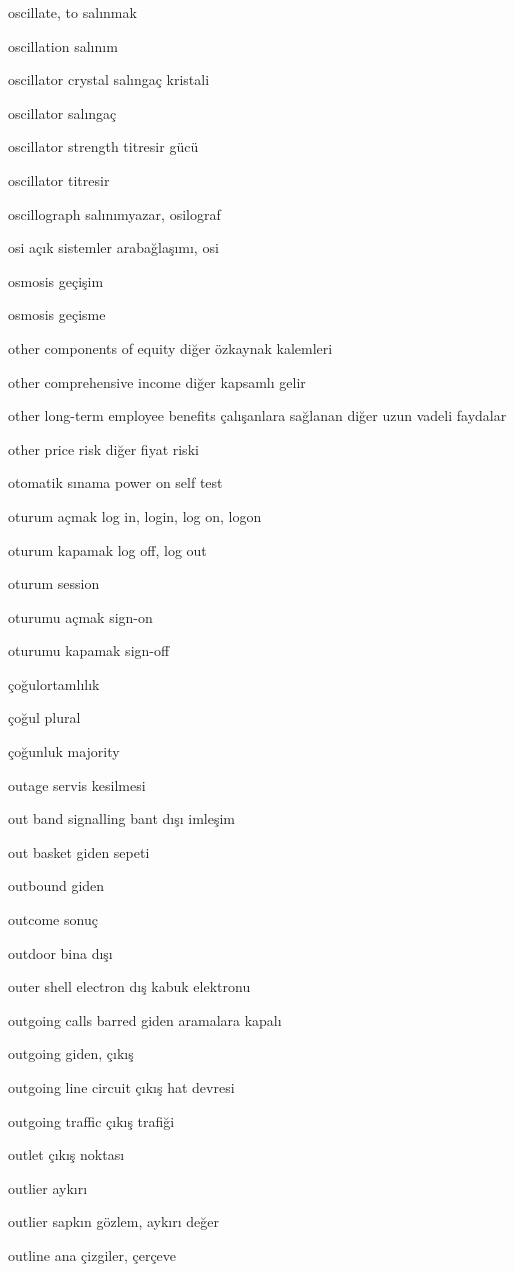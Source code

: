 \documentclass[12pt,fleqn]{article}\usepackage{../../common}
\begin{document}
oscillate, to salınmak

oscillation salınım

oscillator crystal salıngaç kristali

oscillator salıngaç

oscillator strength titresir gücü

oscillator titresir

oscillograph salınımyazar, osilograf

osi açık sistemler arabağlaşımı, osi

osmosis geçişim

osmosis geçisme

other components of equity diğer özkaynak kalemleri

other comprehensive income diğer kapsamlı gelir

other long-term employee benefits çalışanlara sağlanan diğer uzun vadeli faydalar

other price risk diğer fiyat riski

otomatik sınama power on self test

oturum açmak log in, login, log on, logon

oturum kapamak log off, log out

oturum session

oturumu açmak sign-on

oturumu kapamak sign-off

çoğulortamlılık

çoğul plural

çoğunluk majority

outage servis kesilmesi

out band signalling bant dışı imleşim

out basket giden sepeti

outbound giden

outcome sonuç

outdoor bina dışı

outer shell electron dış kabuk elektronu

outgoing calls barred giden aramalara kapalı

outgoing giden, çıkış

outgoing line circuit çıkış hat devresi

outgoing traffic çıkış trafiği

outlet çıkış noktası

outlier aykırı

outlier sapkın gözlem, aykırı değer

outline ana çizgiler, çerçeve
\end{document}
